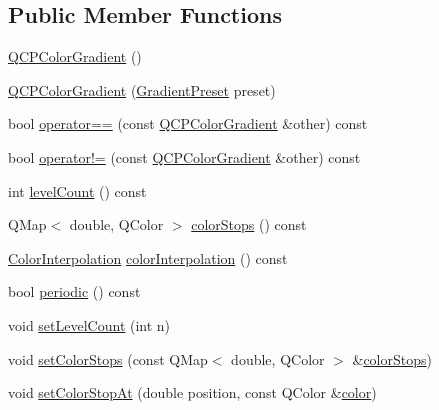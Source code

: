 \subsection*{Public Member Functions}
\begin{DoxyCompactItemize}
\item 
\mbox{\hyperlink{class_q_c_p_color_gradient_a96bcc490ff9dc32b22941ce00800bce0}{Q\+C\+P\+Color\+Gradient}} ()
\item 
\mbox{\hyperlink{class_q_c_p_color_gradient_a4e570b4004fd60bd135e52d685ed2b66}{Q\+C\+P\+Color\+Gradient}} (\mbox{\hyperlink{class_q_c_p_color_gradient_aed6569828fee337023670272910c9072}{Gradient\+Preset}} preset)
\item 
bool \mbox{\hyperlink{class_q_c_p_color_gradient_a7f3478c33c59aa3c03b9ea1f809877fa}{operator==}} (const \mbox{\hyperlink{class_q_c_p_color_gradient}{Q\+C\+P\+Color\+Gradient}} \&other) const
\item 
bool \mbox{\hyperlink{class_q_c_p_color_gradient_ad26a10e3beaef4fc6f2553d1a9756087}{operator!=}} (const \mbox{\hyperlink{class_q_c_p_color_gradient}{Q\+C\+P\+Color\+Gradient}} \&other) const
\item 
int \mbox{\hyperlink{class_q_c_p_color_gradient_ac4b9d7034fc3b6c76318b05075367090}{level\+Count}} () const
\item 
Q\+Map$<$ double, Q\+Color $>$ \mbox{\hyperlink{class_q_c_p_color_gradient_aaab19729e921682401044ac8e518ff02}{color\+Stops}} () const
\item 
\mbox{\hyperlink{class_q_c_p_color_gradient_ac5dca17cc24336e6ca176610e7f77fc1}{Color\+Interpolation}} \mbox{\hyperlink{class_q_c_p_color_gradient_abad5002858db8cf75ecb045200881de6}{color\+Interpolation}} () const
\item 
bool \mbox{\hyperlink{class_q_c_p_color_gradient_a22a1d2b17f203caf0dcec833507fb9e0}{periodic}} () const
\item 
void \mbox{\hyperlink{class_q_c_p_color_gradient_a18da587eb4f7fc788ea28ba15b6a12de}{set\+Level\+Count}} (int n)
\item 
void \mbox{\hyperlink{class_q_c_p_color_gradient_a724e828aa6f0ba5011a9392477c35d3a}{set\+Color\+Stops}} (const Q\+Map$<$ double, Q\+Color $>$ \&\mbox{\hyperlink{class_q_c_p_color_gradient_aaab19729e921682401044ac8e518ff02}{color\+Stops}})
\item 
void \mbox{\hyperlink{class_q_c_p_color_gradient_a3b48be5e78079db1bb2a1188a4c3390e}{set\+Color\+Stop\+At}} (double position, const Q\+Color \&\mbox{\hyperlink{class_q_c_p_color_gradient_a0599545c859268b025d2060dea741cea}{color}})

\end{DoxyCompactItemize}
